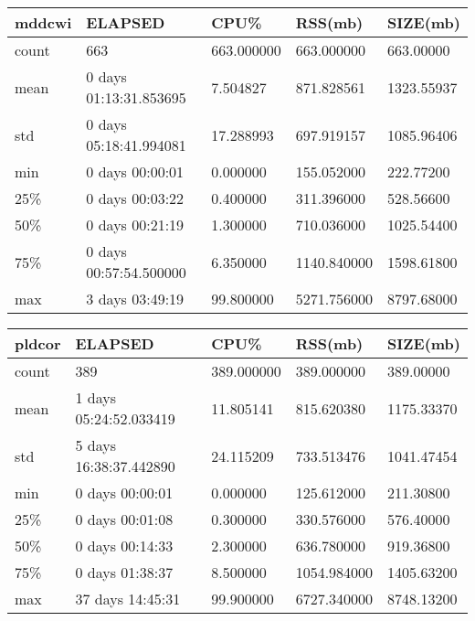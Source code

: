 \documentclass{article}
\begin{document}
\begin{table}[H]
\begin{tabular}{|l|l|l|l|l|}
\hline mddcwi& ELAPSED&   CPU\%&  RSS(mb)&   SIZE(mb) \\
\hline count&    663& 663.000000&  663.000000&  663.00000 \\
\hline mean&  0 days 01:13:31.853695&  7.504827&  871.828561& 1323.55937 \\
\hline std&  0 days 05:18:41.994081&  17.288993&  697.919157& 1085.96406 \\
\hline min&   0 days 00:00:01&  0.000000&  155.052000&  222.77200 \\
\hline 25\%&   0 days 00:03:22&  0.400000&  311.396000&  528.56600 \\
\hline 50\%&   0 days 00:21:19&  1.300000&  710.036000& 1025.54400 \\
\hline 75\%&  0 days 00:57:54.500000&  6.350000& 1140.840000& 1598.61800 \\
\hline max&   3 days 03:49:19&  99.800000& 5271.756000& 8797.68000 \\
\hline 
\end{tabular}
\label{TABLE-SessionSizemddcwi}
\end{table}

\begin{table}[H]
\begin{tabular}{|l|l|l|l|l|}
\hline pldcor& ELAPSED&   CPU\%&  RSS(mb)&   SIZE(mb) \\
\hline count&    389& 389.000000&  389.000000&  389.00000 \\
\hline mean&  1 days 05:24:52.033419&  11.805141&  815.620380& 1175.33370 \\
\hline std&  5 days 16:38:37.442890&  24.115209&  733.513476& 1041.47454 \\
\hline min&   0 days 00:00:01&  0.000000&  125.612000&  211.30800 \\
\hline 25\%&   0 days 00:01:08&  0.300000&  330.576000&  576.40000 \\
\hline 50\%&   0 days 00:14:33&  2.300000&  636.780000&  919.36800 \\
\hline 75\%&   0 days 01:38:37&  8.500000& 1054.984000& 1405.63200 \\
\hline max&  37 days 14:45:31&  99.900000& 6727.340000& 8748.13200 \\
\hline 
\end{tabular}
\label{TABLE-SessionSizepldcor}
\end{table}
\end{document}

